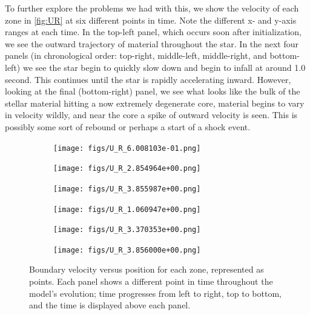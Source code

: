 \documentclass[12pt]{article}
\begin{document}
To further explore the problems we had with this, we show the velocity of each zone in \autoref{fig:UR}
at six different points in time. Note the different x- and y-axis ranges at each time. In the top-left
panel, which occurs soon after initialization, we see
the outward trajectory of material throughout the star. In the next four panels (in chronological order:
top-right, middle-left, middle-right, and bottom-left) we see the star begin to quickly slow down and
begin to infall at around 1.0 second. This continues until the star is rapidly accelerating inward. However,
looking at the final (bottom-right) panel, we see what looks like the bulk of the stellar material hitting
a now extremely degenerate core, material begins to vary in velocity wildly, and near the core a spike
of outward velocity is seen. This is possibly some sort of rebound or perhaps a start of a shock event.

\begin{figure}[ht!]
    \centering
    \begin{minipage}{0.49\linewidth}
        \centering
        \begin{subfigure}{\linewidth}
            \centering
            \texttt{[image: figs/U\_R\_6.008103e-01.png]}
        \end{subfigure}
        \begin{subfigure}{\linewidth}
            \centering
            \texttt{[image: figs/U\_R\_2.854964e+00.png]}
        \end{subfigure}
        \begin{subfigure}{\linewidth}
            \centering
            \texttt{[image: figs/U\_R\_3.855987e+00.png]}
        \end{subfigure}
    \end{minipage}
    \hfill
    \begin{minipage}{0.49\linewidth}
        \centering
        \begin{subfigure}{\linewidth}
            \centering
            \texttt{[image: figs/U\_R\_1.060947e+00.png]}
        \end{subfigure}
        \begin{subfigure}{\linewidth}
            \centering
            \texttt{[image: figs/U\_R\_3.370353e+00.png]}
        \end{subfigure}
        \begin{subfigure}{\linewidth}
            \centering
            \texttt{[image: figs/U\_R\_3.856000e+00.png]}
        \end{subfigure}
    \end{minipage}
    \caption{Boundary velocity versus position for each zone, represented as points. Each panel
             shows a different point in time throughout the model's evolution; time progresses
             from left to right, top to bottom, and the time is displayed above each panel.}
    \label{fig:UR}
\end{figure}
\end{document}
